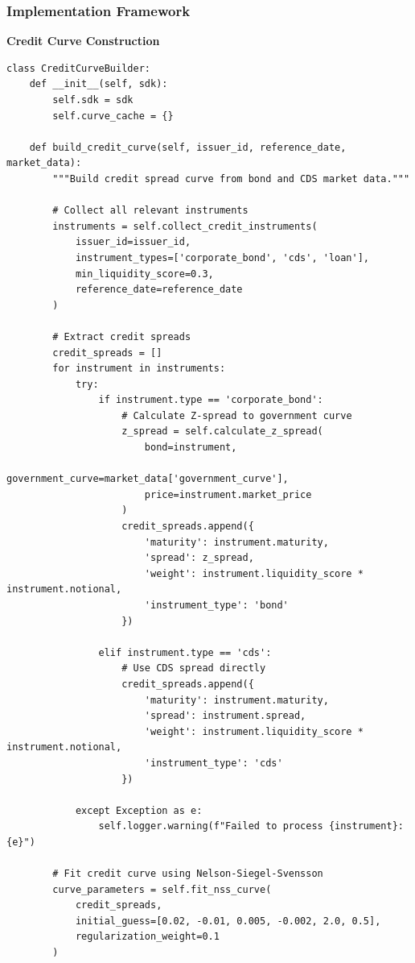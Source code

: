 \documentclass[12pt,a4paper]{article}
\theoremstyle{definition}
\theoremstyle{remark}
\begin{document}
\subsubsection{Implementation Framework}

\textbf{Credit Curve Construction}

\begin{lstlisting}[caption=Multi-Asset Credit Curve Construction]
class CreditCurveBuilder:
    def __init__(self, sdk):
        self.sdk = sdk
        self.curve_cache = {}
        
    def build_credit_curve(self, issuer_id, reference_date, market_data):
        """Build credit spread curve from bond and CDS market data."""
        
        # Collect all relevant instruments
        instruments = self.collect_credit_instruments(
            issuer_id=issuer_id,
            instrument_types=['corporate_bond', 'cds', 'loan'],
            min_liquidity_score=0.3,
            reference_date=reference_date
        )
        
        # Extract credit spreads
        credit_spreads = []
        for instrument in instruments:
            try:
                if instrument.type == 'corporate_bond':
                    # Calculate Z-spread to government curve
                    z_spread = self.calculate_z_spread(
                        bond=instrument,
                        government_curve=market_data['government_curve'],
                        price=instrument.market_price
                    )
                    credit_spreads.append({
                        'maturity': instrument.maturity,
                        'spread': z_spread,
                        'weight': instrument.liquidity_score * instrument.notional,
                        'instrument_type': 'bond'
                    })
                
                elif instrument.type == 'cds':
                    # Use CDS spread directly
                    credit_spreads.append({
                        'maturity': instrument.maturity,
                        'spread': instrument.spread,
                        'weight': instrument.liquidity_score * instrument.notional,
                        'instrument_type': 'cds'
                    })
                        
            except Exception as e:
                self.logger.warning(f"Failed to process {instrument}: {e}")
        
        # Fit credit curve using Nelson-Siegel-Svensson
        curve_parameters = self.fit_nss_curve(
            credit_spreads,
            initial_guess=[0.02, -0.01, 0.005, -0.002, 2.0, 0.5],
            regularization_weight=0.1
        )
        

\end{lstlisting}
\end{document}
